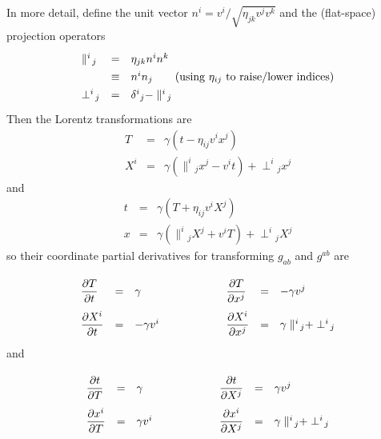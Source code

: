 In more detail, define the unit vector $n^i = v^i / \sqrt{\eta_{jk} v^j v^k}$
and the (flat-space) projection operators
\begin{equation}
\renewcommand{\arraystretch}{1.333}
\begin{array}{lclcl}
\parallel^i{}\!_j
		& = &	\eta_{jk} n^i n^k				\\
		& \equiv &
			n^i n_j
			\qquad
			\hbox{(using $\eta_{ij}$ to raise/lower indices)}
									\\
\perp^i{}\!_j	& = &	\delta^i{}_j - \parallel^i{}\!_j		%
\end{array}
\end{equation}
Then the Lorentz transformations are
\begin{equation}
\renewcommand{\arraystretch}{1.333}
\begin{array}{lcl}
T	& = &	\gamma (t - \eta_{ij} v^i x^j)				\\
X^i	& = &	\gamma (\parallel^i{}\!_j x^j - v^i t)
		+ \perp^i{}\!_j x^j					%
\end{array}
\end{equation}
and
\begin{equation}
\renewcommand{\arraystretch}{1.333}
\begin{array}{lcl}
t	& = &	\gamma (T + \eta_{ij} v^i X^j)				\\
x	& = &	\gamma (\parallel^i{}\!_j X^j + v^i T)
		+ \perp^i{}\!_j X^j					%
\end{array}
\end{equation}
so their coordinate partial derivatives for transforming $g_{ab}$
and $g^{ab}$ are
\begin{equation}
\renewcommand{\arraystretch}{2.5}
\begin{array}{lcl@{\qquad\qquad\qquad}lcl}
\dfrac{\partial T}{\partial t}		& = &	\gamma
	&
\dfrac{\partial T}{\partial x^j}	& = &	- \gamma v^j		\\
\dfrac{\partial X^i}{\partial t}	& = &	- \gamma v^i
	&
\dfrac{\partial X^i}{\partial x^j}	& = &	\gamma \parallel^i{}\!_j
						+ \perp^i{}\!_j		%
\end{array}
\end{equation}
and
\begin{equation}
\renewcommand{\arraystretch}{2.5}
\begin{array}{lcl@{\qquad\qquad\qquad}lcl}
\dfrac{\partial t}{\partial T}		& = &	\gamma
	&
\dfrac{\partial t}{\partial X^j}	& = &	\gamma v^j		\\
\dfrac{\partial x^i}{\partial T}	& = &	\gamma v^i
	&
\dfrac{\partial x^i}{\partial X^j}	& = &	\gamma \parallel^i{}\!_j
						+ \perp^i{}\!_j		%
\end{array}
\end{equation}

